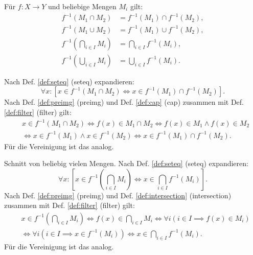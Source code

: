 \begin{Satz}%
\label{preimg-dl}\newlinefirst
Für $f\colon X\to Y$ und beliebige Mengen $M_i$ gilt:%
\begin{align}
f^{-1}(M_1\cap M_2) &= f^{-1}(M_1)\cap f^{-1}(M_2),\\
f^{-1}(M_1\cup M_2) &= f^{-1}(M_1)\cup f^{-1}(M_2),\\
f^{-1}(\bigcap_{i\in I} M_i) &= \bigcap_{i\in I} f^{-1}(M_i),\\
f^{-1}(\bigcup_{i\in I} M_i) &= \bigcup_{i\in I} f^{-1}(M_i).
\end{align}
\end{Satz}

\begin{Beweis}
Nach Def. \ref{def:seteq} (seteq) expandieren:
\[\forall x\colon [x\in f^{-1}(M_1\cap M_2)\iff x\in f^{-1}(M_1)\cap f^{-1}(M_2)].\]
Nach Def. \ref{def:preimg} (preimg) und Def. \ref{def:cap} (cap)
zusammen mit Def. \ref{def:filter} (filter) gilt:
\begin{align*}
& x\in f^{-1}(M_1\cap M_2) \iff f(x)\in M_1\cap M_2
\iff f(x)\in M_1\land f(x)\in M_2\\
&\iff x\in f^{-1}(M_1)\land x\in f^{-1}(M_2)
\iff x\in f^{-1}(M_1)\cap f^{-1}(M_2).
\end{align*}
Für die Vereinigung ist das analog.

Schnitt von beliebig vielen Mengen.
Nach Def. \ref{def:seteq} (seteq) expandieren:
\[\forall x\colon [x\in f^{-1}(\bigcap_{i\in I}M_i)
\iff x\in \bigcap_{i\in I} f^{-1}(M_i)].\]
Nach Def. \ref{def:preimg} (preimg) und Def. \ref{def:intersection}
(intersection) zusammen mit Def. \ref{def:filter} (filter) gilt:
\begin{align*}
& x\in f^{-1}(\bigcap_{i\in I} M_i)\iff f(x)\in\bigcap_{i\in I} M_i
\iff \forall i(i\in I\implies f(x)\in M_i)\\
&\iff \forall i(i\in I\implies x\in f^{-1}(M_i))
\iff x\in \bigcap_{i\in I} f^{-1}(M_i).
\end{align*}
Für die Vereinigung ist das analog.\;\qedsymbol
\end{Beweis}

